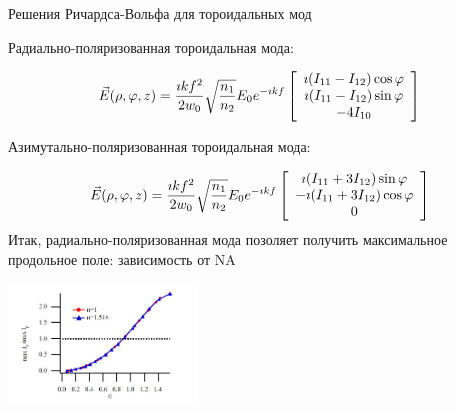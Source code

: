 \documentclass[9pt, compress, xcolor=table]{beamer}
\begin{document}
\begin{frame}{Решения Ричардса-Вольфа для тороидальных мод}

Радиально-поляризованная тороидальная мода:

\begin{equation*}
\begin{gathered}
\vec E(\rho, \varphi, z) = \frac{\imath k f^2}{2w_0} \sqrt
{\frac{n_1}{n_2}}E_0 e^{-\imath k f} \left[\array{c} \imath
(I_{11}-I_{12}) \cos \varphi \\  \imath (I_{11}-I_{12}) \sin
\varphi \\ -4 I_{10} \endarray\right]
\end{gathered}
\end{equation*}

Азимутально-поляризованная тороидальная мода:

\begin{equation*}
\begin{gathered}
\vec E(\rho, \varphi, z) = \frac{\imath k f^2}{2w_0} \sqrt
{\frac{n_1}{n_2}}E_0 e^{-\imath k f} \left[\array{c} \imath
(I_{11}+3 I_{12}) \sin \varphi \\ - \imath (I_{11}+ 3 I_{12})
\cos \varphi \\ 0 \endarray\right]
\end{gathered}
\end{equation*}
Итак, радиально-поляризованная мода позоляет получить максимальное продольное поле: зависимость от NA
\begin{center}
\includegraphics[width=5cm]{fig3_19}
\end{center}

\end{frame}
\end{document}
